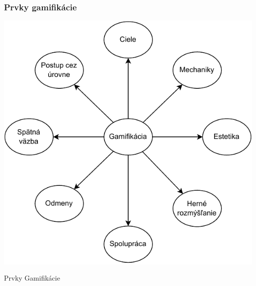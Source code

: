 \documentclass{beamer}
\begin{document}
\begin{frame}[fragile=singleslide,plain]\frametitle{Prvky gamifikácie}
\begin{center}
\includegraphics[scale=.6]{prvky.pdf}

{\tiny Prvky Gamifikácie}
\end{center}
\end{frame}
\end{document}
